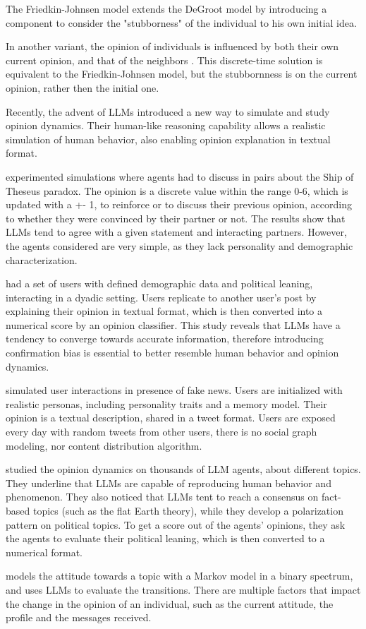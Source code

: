 The Friedkin-Johnsen model \cite{friedkin_1990} extends the DeGroot model by introducing a component to consider the "stubborness" of the individual to his own initial idea. 

In another variant, the opinion of individuals is influenced by both their own current opinion, and that of the neighbors \cite{Ye2018Opinion, Liu_2018}. This discrete-time solution is equivalent to the Friedkin-Johnsen model, but the stubbornness is on the current opinion, rather then the initial one.


Recently, the advent of LLMs introduced a new way to simulate and study opinion dynamics.
Their human-like reasoning capability allows a realistic simulation of human behavior, also enabling opinion explanation in textual format.

\citet{cau2025languagedrivenopiniondynamicsagentbased} experimented simulations where agents had to discuss in pairs about the Ship of Theseus paradox.
The opinion is a discrete value within the range 0-6, which is updated with a +- 1,  to reinforce or to discuss their previous opinion, according to whether they were convinced by their partner or not.
The results show that LLMs tend to agree with a given statement and interacting partners. However, the agents considered are very simple, as they lack personality and demographic characterization.

\citet{chuang2024simulatingopiniondynamicsnetworks} had a set of users with defined demographic data and political leaning, interacting in a dyadic setting. Users replicate to another user's post by explaining their opinion in textual format, which is then converted into a numerical score by an opinion classifier.
This study reveals that LLMs have a tendency to converge towards accurate information, therefore introducing confirmation bias is essential to better resemble human behavior and opinion dynamics.

\citet{Liu_2024} simulated user interactions in presence of fake news. Users are initialized with realistic personas, including personality traits and a memory model. Their opinion is a textual description, shared in a tweet format. 
Users are exposed every day with random tweets from other users, there is no social graph modeling, nor content distribution algorithm.

\citet{piao2025emergencehumanlikepolarizationlarge} studied the opinion dynamics on thousands of LLM agents, about different topics. They underline that LLMs are capable of reproducing human behavior and phenomenon. They also noticed that LLMs tent to reach a consensus on fact-based topics (such as the flat Earth theory), while they develop a polarization pattern on political topics.
To get a score out of the agents' opinions, they ask the agents to evaluate their political leaning, which is then converted to a numerical format.

\citet{gao2023s3socialnetworksimulationlarge} models the attitude towards a topic with a Markov model in a binary spectrum, and uses LLMs to evaluate the transitions. There are multiple factors that impact the change in the opinion of an individual, such as the current attitude, the profile and the messages received.


